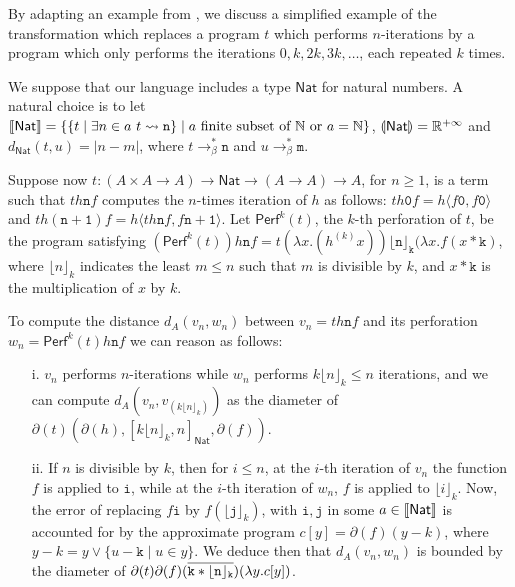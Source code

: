 \begin{example}
By adapting an example from \cite{chaudhuri}, we discuss a simplified example of the transformation which replaces a program $t$ which performs $n$-iterations by a program which only performs the iterations $0,k,2k,3k,\dots$, each repeated $k$ times. 


We suppose that our language includes a type $\mathsf{Nat}$ for natural numbers. A natural choice is to let   
$\llbracket \mathsf{Nat} \rrbracket=\{ \{ t \mid \exists n\in a \ t\leadsto \mathtt n\}\mid a \text{ finite subset of }\mathbb N \text{ or }a=\mathbb N\}$, $\llparenthesis \mathsf{Nat} \rrparenthesis=\mathbb R^{+\infty}$ and $d_{\mathsf{Nat}}(t,u)=| n-m|$, where $t\to^{*}_{\beta}\mathtt n$ and $u\to^{*}_{\beta}\mathtt m$. 


Suppose now  $t: (A\times A\to A) \to \mathsf{Nat}\to (A\to A)\to A$, for $n\geq 1$, is a term such that $th\mathtt n f$ 
computes the $n$-times iteration of $h$ as follows: $th \mathtt 0f= h\langle f\mathtt 0, f\mathtt 0\rangle$ and $th(\mathtt{n+1})f=h\langle th\mathtt n f, f\mathtt{n+1}\rangle$. 
Let $\mathsf{Perf}^{k}(t)$, the $k$-th perforation of $t$, be the program satisfying  
$(\mathsf{Perf}^{k}(t))h\mathtt nf= t(\lambda x. (h^{(k)}x)) \mathtt{\lfloor n\rfloor_{k}} (\lambda x. f(x* \mathtt k)$, where $\lfloor n\rfloor_{k}$ indicates the least $m\leq n$ such that $m$ is divisible by $k$, and $x*\mathtt k$ is the multiplication of $x$ by $k$. 





To compute the distance 
$d_{A}(v_{n},w_{n}    )$ between  $v_{n}=th\mathtt n f $ and its perforation $w_{n}=\mathsf{Perf}^{k}(t)h\mathtt nf$  we can reason as follows: 
\begin{itemize}

\item[i.] $v_{n}$ performs $n$-iterations while $w_{n}$ performs $k\lfloor n\rfloor_{k}  \leq n$ iterations, and we can compute  
$d_{A}(v_{n}, v_{(k \lfloor n\rfloor_{k})})$ as the diameter of 
$\partial(t)(\partial(h), [ k \lfloor n\rfloor_{k}, n]_{\mathsf{Nat}}, \partial(f))$.




\item[ii.] If $n$ is divisible by $k$, then for $i\leq n$, at the $i$-th iteration of $v_{n}$ the function $f$ is applied  to $\mathtt i$, while at the $i$-th iteration of $w_{n}$, $f$ is applied to $\lfloor i\rfloor_{k}$. Now, the error of replacing  $f\mathtt i$ by $ f(\lfloor \mathtt j\rfloor_{k})$, with $\mathtt i,\mathtt j$ in some $a\in \llbracket \mathsf{Nat} \rrbracket$ is accounted for by the approximate program $c[y]= \partial(f)(y-k  )$, where $y-k= y \vee \{u-\mathtt k\mid u \in y\}$.
We deduce then that 
$d_{A}(v_{n}, w_{n})$ is bounded by the diameter of $\partial(t)\partial(f)( \overline{\mathtt{k* \lfloor n\rfloor_{k}}} )(\lambda y.c[y])$.


\end{itemize}
\end{example}

